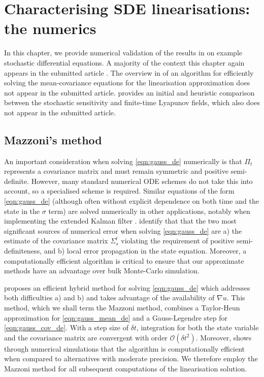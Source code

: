 
\chapter{Characterising SDE linearisations: the numerics}\label{ch:linear_numerics}
In this chapter, we provide numerical validation of the results in  on example stochastic differential equations.
A majority of the context this chapter again appears in the submitted article \citep{BlakeEtAl_2023_ConvergenceStochasticDifferential}.
The overview in  of an algorithm for efficiently solving the mean-covariance equations for the linearisation approximation does not appear in the submitted article.
 provides an initial and heuristic comparison between the stochastic sensitivity and finite-time Lyapunov fields, which also does not appear in the submitted article.

\section{Mazzoni's method}\label{sec:mazzoni}
An important consideration  when solving \cref{eqn:gauss_de} numerically is that \(\Pi_t\) represents a covariance matrix and must remain symmetric and positive semi-definite.
However, many standard numerical ODE schemes do not take this into account, so a specialised scheme is required.
Similar equations of the form \cref{eqn:gauss_de} (although often without explicit dependence on both time and the state in the \(\sigma\) term) are solved numerically in other applications, notably when implementing the extended Kalman filter \citep{Jazwinski_2014_StochasticProcessesFiltering, KulikovaKulikov_2014_AdaptiveODESolvers}.
\citet{KulikovaKulikov_2014_AdaptiveODESolvers} identify that that the two most significant sources of numerical error when solving \cref{eqn:gauss_de} are a) the estimate of the covariance matrix \(\Sigma_s^t\) violating the requirement of positive semi-definiteness, and b) local error propagation in the state equation.
Moreover, a computationally efficient algorithm is critical to ensure that our approximate methods have an advantage over bulk Monte-Carlo simulation.

\citet{Mazzoni_2008_ComputationalAspectsContinuous} proposes an efficient hybrid method for solving \cref{eqn:gauss_de} which addresses both difficulties a) and b) and takes advantage of the availability of \(\nabla u\).
This method, which we shall term the Mazzoni method, combines a Taylor-Heun approximation for \cref{eqn:gauss_mean_de} and a Gauss-Legendre step for \cref{eqn:gauss_cov_de}.
With a step size of \(\delta t\), integration for both the state variable and the covariance matrix are convergent with order \(\mathcal{O}\!\left(\delta t^2\right)\).
Moreover, \citet{Mazzoni_2008_ComputationalAspectsContinuous} shows through numerical simulations that the algorithm is computationally efficient when compared to alternatives with moderate precision.
We therefore employ the Mazzoni method for all subsequent computations of the linearisation solution.

